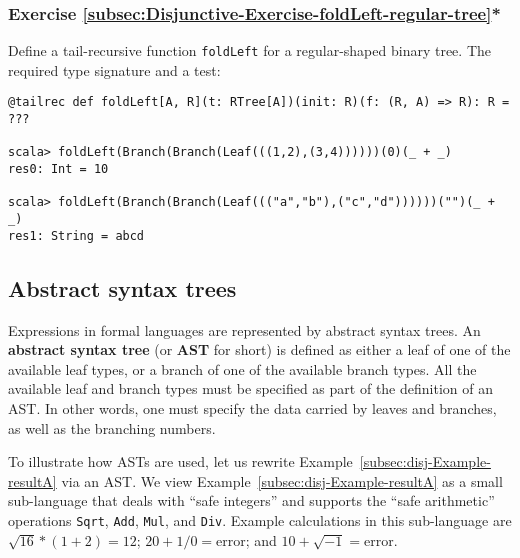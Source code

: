 \subsubsection{Exercise \label{subsec:Disjunctive-Exercise-foldLeft-regular-tree}\ref{subsec:Disjunctive-Exercise-foldLeft-regular-tree}{*}}

Define a tail-recursive function \lstinline!foldLeft! for a regular-shaped
binary tree. The required type signature and a test:
\begin{lstlisting}
@tailrec def foldLeft[A, R](t: RTree[A])(init: R)(f: (R, A) => R): R = ???

scala> foldLeft(Branch(Branch(Leaf(((1,2),(3,4))))))(0)(_ + _)
res0: Int = 10

scala> foldLeft(Branch(Branch(Leaf((("a","b"),("c","d"))))))("")(_ + _)
res1: String = abcd
\end{lstlisting}
\begin{comment}
Solution:

\begin{lstlisting}
@tailrec def foldLeft[A, R](t: RTree[A])(init: R)(f: (R, A) => R): R = t match {
  case Leaf(x)    => f(init, x)
  case Branch(xs) => foldLeft(xs)(init) { case (r, (a, b)) => f(f(r, a), b) } 
}
\end{lstlisting}
\end{comment}


\subsection{Abstract syntax trees}

Expressions in formal languages are represented by abstract syntax
trees. An \textbf{abstract syntax tree}\textbf{
}(or \textbf{AST} for short) is defined as either a leaf of one of
the available leaf types, or a branch of one of the available branch
types. All the available leaf and branch types must be specified as
part of the definition of an AST. In other words, one must specify
the data carried by leaves and branches, as well as the branching
numbers.

To illustrate how ASTs are used, let us rewrite Example~\ref{subsec:disj-Example-resultA}
via an AST. We view Example~\ref{subsec:disj-Example-resultA} as
a small sub-language that deals with ``safe integers'' and supports
the ``safe arithmetic'' operations \lstinline!Sqrt!, \lstinline!Add!,
\lstinline!Mul!, and \lstinline!Div!. Example calculations in this
sub-language are $\sqrt{16}*(1+2)=12$; $20+1/0=\text{error}$; and
$10+\sqrt{-1}=\text{error}$. 

